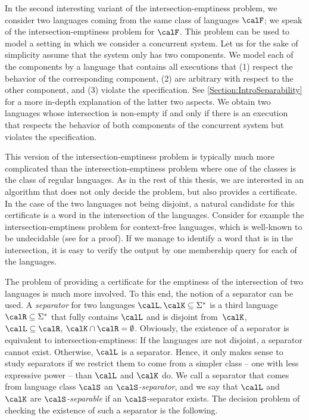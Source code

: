 \documentclass[../../diss.tex]{subfiles}
\begin{document}
In the second interesting variant of the intersection-emptiness problem, we consider two languages coming from the same class of languages $\calF$; we speak of the intersection-emptiness problem for $\calF$.
This problem can be used to model a setting in which we consider a concurrent system.
Let us for the sake of simplicity assume that the system only has two components.
We model each of the components by a language that contains all executions that (1) respect the behavior of the corresponding component, (2) are arbitrary with respect to the other component, and (3) violate the specification.
See \cref{Section:IntroSeparability} for a more in-depth explanation of the latter two aspects.
We obtain two languages whose intersection is non-empty if and only if there is an execution that respects the behavior of both components of the concurrent system but violates the specification.

This version of the intersection-emptiness problem is typically much more complicated than the intersection-emptiness problem where one of the classes is the class of regular languages.
As in the rest of this thesis, we are interested in an algorithm that does not only decide the problem, but also provides a certificate.
In the case of the two languages not being disjoint, a natural candidate for this certificate is a word in the intersection of the languages.
Consider for example the intersection-emptiness problem for context-free languages, which is well-known to be undecidable (see \eg \cite{HopcroftU79} for a proof).
If we manage to identify a word that is in the intersection, it is easy to verify the output by one membership query for each of the languages.

The problem of providing a certificate for the emptiness of the intersection of two languages is much more involved.
To this end, the notion of a separator can be used.
A \emph{separator} for two languages $\calL, \calK \subseteq \Sigma^*$ is a third language $\calR \subseteq \Sigma^*$ that fully contains $\calL$ and is disjoint from~$\calK$, \ie $\calL \subseteq \calR$, $\calK \cap \calR = \emptyset$.
Obviously, the existence of a separator is equivalent to intersection-emptiness:
If the languages are not disjoint, a separator cannot exist.
Otherwise, $\calL$ is a separator.
Hence, it only makes sense to study separators if we restrict them to come from a simpler class -- one with less expressive power -- than $\calL$ and $\calK$ do.
We call a separator that comes from language class $\calS$ an \emph{$\calS$-separator}, and we say that $\calL$ and $\calK$ are \emph{$\calS$-separable} if an $\calS$-separator exists.
The decision problem of checking the existence of such a separator is the following.
\end{document}

